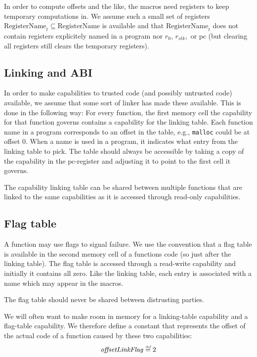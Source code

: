 \documentclass[a4paper]{article}
\newcommand{\defeq}{\stackrel{\textit{\tiny{def}}}{=}}
\newcommand{\var}[1]{\mathit{#1}}
\newcommand{\pcreg}{\mathrm{pc}}
\newcommand{\stk}{\var{stk}}
\newcommand{\olf}{\var{offsetLinkFlag}}
\newcommand{\plaindom}[1]{\mathrm{#1}}
\newcommand{\RegName}{\plaindom{RegisterName}}
\begin{document}
              In order to compute offsets and the like, the macros need registers to keep temporary computations in. We assume such a small set of registers $\RegName_t \subseteq \RegName$ is available and that $\RegName_t$ does not contain registers explicitely named in a program nor $r_0$, $r_\stk,$ or $\pcreg$ (but clearing all registers still clears the temporary registers).

              \subsection{Linking and ABI}
              In order to make capabilities to trusted code (and possibly untrusted code) available, we assume that some sort of linker has made these available. This is done in the following way: For every function, the first memory cell the capability for that function governs contains a capability for the linking table. Each function name in a program corresponds to an offset in the table, e.g., \texttt{malloc} could be at offset 0. When a name is used in a program, it indicates what entry from the linking table to pick. The table should always be accessible by taking a copy of the capability in the $\pcreg$-register and adjusting it to point to the first cell it governs.

              The capability linking table can be shared between multiple functions that are linked to the same capabilities as it is accessed through read-only capabilities.


              \subsection{Flag table}
              A function may use flags to signal failure. We use the convention that a flag table is available in the second memory cell of a functions code (so just after the linking table). The flag table is accessed through a read-write capability and initially it contains all zero. Like the linking table, each entry is associated with a name which may appear in the macros.

              The flag table should never be shared between distrusting parties.

              We will often want to make room in memory for a linking-table capability and a flag-table capability. We therefore define a constant that represents the offset of the actual code of a function caused by these two capabilities:
              \[
                \olf \defeq 2
              \]
\end{document}
